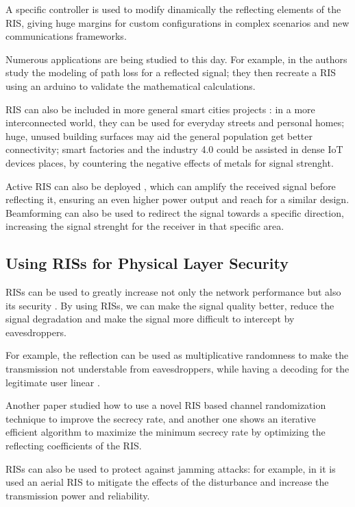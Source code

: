 A specific controller is used to modify dinamically the reflecting elements of the RIS, giving huge margins for custom configurations in complex scenarios and new communications frameworks.

Numerous applications are being studied to this day. For example, in \cite{9881509} the authors study the modeling of path loss for a reflected signal; they then recreate a RIS using an arduino to validate the mathematical calculations.

RIS can also be included in more general smart cities projects \cite{9253607}: in a more interconnected world, they can be used for everyday streets and personal homes; huge, unused building surfaces may aid the general population get better connectivity; smart factories and the industry 4.0 could be assisted in dense IoT devices places, by countering the negative effects of metals for signal strenght.

Active RIS can also be deployed \cite{9377648}, which can amplify the received signal before reflecting it, ensuring an even higher power output and reach for a similar design. Beamforming can also be used to redirect the signal towards a specific direction, increasing the signal strenght for the receiver in that specific area.

\subsection{Using RISs for Physical Layer Security}

RISs can be used to greatly increase not only the network performance but also its security \cite{10409564}. By using RISs, we can make the signal quality better, reduce the signal degradation and make the signal more difficult to intercept by eavesdroppers.

For example, the reflection can be used as multiplicative randomness to make the transmission not understable from eavesdroppers, while having a decoding for the legitimate user linear \cite{9328149}.

Another paper \cite{s21041439} studied how to use a novel RIS based channel randomization technique to improve the secrecy rate, and another one \cite{8742603} shows an iterative efficient algorithm to maximize the minimum secrecy rate by optimizing the reflecting coefficients of the RIS.

RISs can also be used to protect against jamming attacks: for example, in \cite{9424472} it is used an aerial RIS to mitigate the effects of the disturbance and increase the transmission power and reliability.

